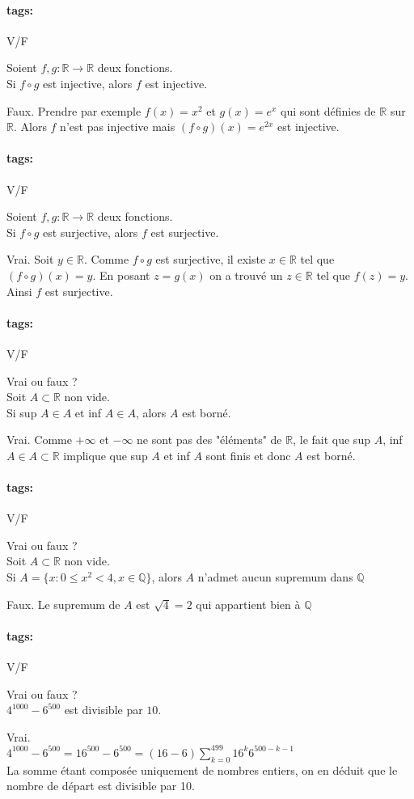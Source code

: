 \documentclass[12pt]{article}
\newcommand*{\xfield}[1]{\begin{mdframed}\centering #1\end{mdframed}\bigskip}
\newenvironment{note}{}{}
\newcommand*{\tags}[1]{\paragraph{tags: }#1}
\begin{document}
\begin{note}
\tags{V/F}
	\xfield{Soient $f, g : \mathbb{R} \to \mathbb{R}$ deux fonctions.\\
	Si $f \circ g$ est injective, alors $f$ est injective.}
	\xfield{Faux. Prendre par exemple $f(x) = x^2$ et $g(x) = e^x$ qui sont définies de $\mathbb{R}$ sur $\mathbb{R}$. Alors $f$ n'est pas injective mais $(f\circ g)(x) = e^{2x}$ est injective.}
\end{note}

\begin{note}
\tags{V/F}
	\xfield{Soient $f, g : \mathbb{R} \to \mathbb{R}$ deux fonctions.\\
	Si $f \circ g$ est surjective, alors $f$ est surjective.}
	\xfield{Vrai. Soit $y \in \mathbb{R}$. Comme $f\circ g$ est surjective, il existe $x\in \mathbb{R}$ tel que $(f\circ g)(x) = y$. En posant $z = g(x)$ on a trouvé un $z \in \mathbb{R}$ tel que $f(z) = y$. Ainsi $f$ est surjective.}
\end{note}

\begin{note}
\tags{V/F}
	\xfield{Vrai ou faux ?\\
	Soit $A \subset \mathbb{R}$ non vide.\\
	Si sup $A \in A$ et inf $A \in A$, alors $A$ est borné.}
	\xfield{Vrai. Comme $+\infty$ et $-\infty$ ne sont pas des "éléments" de $\mathbb{R}$, le fait que sup $A$, inf $A \in A \subset \mathbb{R}$ implique que sup $A$ et inf $A$ sont finis et donc $A$ est borné.}
\end{note}

\begin{note}
\tags{V/F}
	\xfield{Vrai ou faux ?\\
	Soit $A \subset \mathbb{R}$ non vide.\\
	Si $A = \{x:0 \le x^2 < 4, x \in \mathbb{Q}\}$, alors $A$ n'admet aucun supremum dans $\mathbb{Q}$}
	\xfield{Faux. Le supremum de $A$ est $\sqrt{4} = 2$ qui appartient bien à $\mathbb{Q}$}
\end{note}

\begin{note}
\tags{V/F}
	\xfield{Vrai ou faux ?\\
	$4^{1000} - 6^{500}$ est divisible par $10$.}
	\xfield{Vrai.\\
	$4^{1000} - 6^{500} = 16^{500} - 6^{500} = (16-6) \sum\limits^{499}_{k=0}16^k 6^{500-k-1}$\\
	La somme étant composée uniquement de nombres entiers, on en déduit que le nombre de départ est divisible par 10.}
\end{note}
\end{document}
